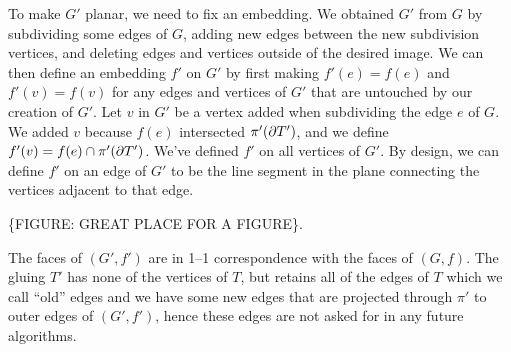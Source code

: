 To make $G'$ planar, we need to fix an embedding.
We obtained $G'$ from $G$ by subdividing some edges of $G$, adding new edges between the new subdivision vertices, and deleting edges and vertices outside of the desired image.
We can then define an embedding $f'$ on $G'$ by first making $f'(e)=f(e)$ and $f'(v)=f(v)$ for any edges and vertices of $G'$ that are untouched by our creation of $G'$.
Let $v$ in $G'$ be a vertex added when subdividing the edge $e$ of $G$.
We added $v$ because $f(e)$ intersected $\pi'(\partial T')$, and we define $f'(v)=f(e)\cap \pi'(\partial T')$.
We've defined $f'$ on all vertices of $G'$.
By design, we can define $f'$ on an edge of $G'$ to be the line segment in the plane connecting the vertices adjacent to that edge.

\{FIGURE: GREAT PLACE FOR A FIGURE\}.

The faces of $(G',f')$ are in 1--1 correspondence with the faces of $(G,f)$.
The gluing $T'$ has none of the vertices of $T$, but retains all of the edges of $T$ which we call ``old'' edges and we have some new edges that are projected through $\pi'$ to outer edges of $(G',f')$, hence these edges are not asked for in any future algorithms.

